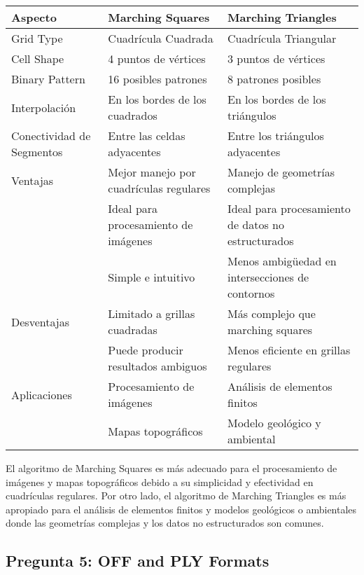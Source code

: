 \documentclass{article}
\begin{document}
\begin{table}[h!]
    \centering
    \begin{tabular}{|l|l|l|}
        \hline
        Aspecto & Marching Squares & Marching Triangles \\
        \hline
        Grid Type & Cuadrícula Cuadrada & Cuadrícula Triangular \\
        \hline
        Cell Shape & 4 puntos de vértices & 3 puntos de vértices \\
        \hline
        Binary Pattern & 16 posibles patrones & 8 patrones posibles \\
        \hline
        Interpolación & En los bordes de los cuadrados & En los bordes de los triángulos \\
        \hline
        Conectividad de Segmentos & Entre las celdas adyacentes & Entre los triángulos adyacentes \\
        \hline
        Ventajas & Mejor manejo por cuadrículas regulares & Manejo de geometrías complejas \\
        & Ideal para procesamiento de imágenes & Ideal para procesamiento de datos no estructurados \\
        & Simple e intuitivo & Menos ambigüedad en intersecciones de contornos \\
        \hline
        Desventajas & Limitado a grillas cuadradas & Más complejo que marching squares \\
        & Puede producir resultados ambiguos & Menos eficiente en grillas regulares \\
        \hline
        Aplicaciones & Procesamiento de imágenes & Análisis de elementos finitos \\
        & Mapas topográficos & Modelo geológico y ambiental \\
        \hline
    \end{tabular}
\end{table}

El algoritmo de Marching Squares es más adecuado para el procesamiento de imágenes y mapas topográficos debido a su simplicidad y efectividad en cuadrículas regulares. Por otro lado, el algoritmo de Marching Triangles es más apropiado para el análisis de elementos finitos y modelos geológicos o ambientales donde las geometrías complejas y los datos no estructurados son comunes.

\subsection{Pregunta 5: OFF and PLY Formats}
\end{document}
